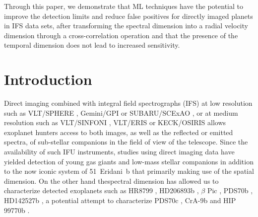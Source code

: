\documentclass{aa}
\begin{document}
  {Through this paper, we demonstrate that ML techniques have the potential to improve the detection limits and reduce false positives for directly imaged planets in IFS data sets, after transforming the spectral dimension into a radial velocity dimension through a cross-correlation operation and that the presence of the temporal dimension does not lead to increased sensitivity.
  }
   

\maketitle
%

\section{Introduction}

Direct imaging combined with integral field spectrographs (IFS) at low resolution such as VLT/SPHERE \citep{2019Beuzit}, Gemini/GPI \citep{2014MacintoshGPI} or SUBARU/SCExAO \citep{2015SCeXAO}, or at medium resolution such as VLT/SINFONI \citep{2004SINFONI}, VLT/ERIS \citep{2023Davies} or KECK/OSIRIS \citep{2000OSIRIS} allows exoplanet hunters access to both images, as well as the reflected or emitted spectra, of sub-stellar companions in the field of view of the telescope.
Since the availability of such IFU instruments, studies using direct imaging data have yielded detection of young gas giants \citep[e.g., PDS70b, ][]{2018KepplerPDS70} and low-mass stellar companions \citep[e.g., HD142527b, ][]{2019ClaudiHD142527b} in addition to the now iconic system of 51~Eridani~b \citep{2015MacintoshEridani} that primarily making use of the spatial dimension.
On the other hand thespectral dimension has allowed us to characterize detected exoplanets such as HR8799 \citep[e.g][]{2008Marois, 2013Konopacky}, HD206893b \citep[][]{2017DelormeHD206893b}, $\beta$ Pic \citep[][]{2017ChilcoteBetapic}, PDS70b \citep[e.g][]{2018MullerPDS70,2019ChristiaensPDS70}, HD142527b \citep[][]{2018A&ChristiaensHD142527}, a potential attempt to characterize PDS70c \citep[][]{2019MesaPDS70}, CrA-9b \citep[][]{2021ChristiaensCrA-9b} and HIP 99770b \citep[][]{2023Currie}.
\end{document}
